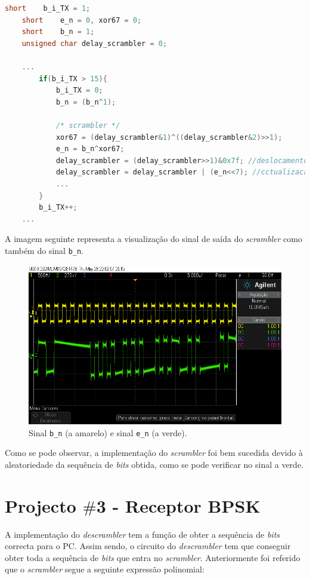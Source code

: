 \documentclass[11pt]{article}
\numberwithin{equation}{section}
\begin{document}
\begin{lstlisting}[language=C]
	short    b_i_TX = 1;
	short    e_n = 0, xor67 = 0;
	short    b_n = 1;
	unsigned char delay_scrambler = 0;
	
	...
		if(b_i_TX > 15){
			b_i_TX = 0;
			b_n = (b_n^1);
			 
			/* scrambler */
			xor67 = (delay_scrambler&1)^((delay_scrambler&2)>>1);
			e_n = b_n^xor67;
			delay_scrambler = (delay_scrambler>>1)&0x7f; //deslocamento temporal
			delay_scrambler = delay_scrambler | (e_n<<7); //cctualizacao do novo valor de e_n no vector
			...
		}
		b_i_TX++;	
	...
\end{lstlisting}

A imagem seguinte representa a visualização do sinal de saída do \textit{scrambler} como também do sinal \texttt{b\_n}.

\begin{figure}[H]
	\centering
	\includegraphics[keepaspectratio=true, scale=0.40]{exps/ScramblerBnVsEn}
	\caption{Sinal \texttt{b\_n} (a amarelo) e sinal \texttt{e\_n} (a verde).}
	\vspace{-0.8em}
\end{figure}

Como se pode observar, a implementação do \textit{scrambler} foi bem sucedida devido à aleatoriedade da sequência de \textit{bits} obtida, como se pode verificar no sinal a verde. 

\pagebreak

\section{Projecto $\#$3 - Receptor BPSK}



A implementação do \textit{descrambler} tem a função de obter a sequência de \textit{bits} correcta para o PC. Assim sendo, o circuito do \textit{descrambler} tem que conseguir obter toda a sequência de \textit{bits} que entra no \textit{scrambler}.
Anteriormente foi referido que o \textit{scrambler} segue a seguinte expressão polinomial:
\end{document}
